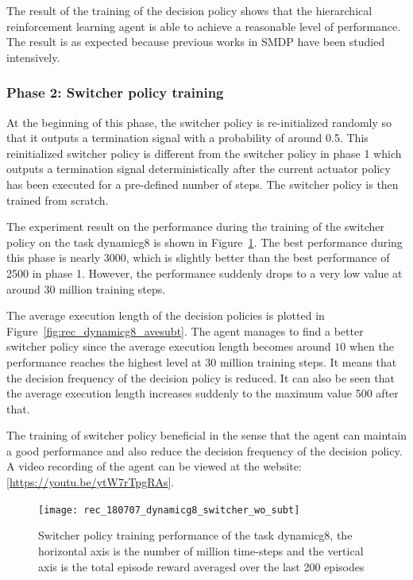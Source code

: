 The result of the training of the decision policy shows that the hierarchical reinforcement learning agent is able to achieve a reasonable level of performance. The result is as expected because previous works in SMDP have been studied intensively.

\subsubsection{Phase 2: Switcher policy training}
At the beginning of this phase, the switcher policy is re-initialized randomly so that it outputs a termination signal with a probability of around 0.5. This reinitialized switcher policy is different from the switcher policy in phase 1 which outputs a termination signal deterministically after the current actuator policy has been executed for a pre-defined number of steps. The switcher policy is then trained from scratch.

The experiment result on the performance during the training of the switcher policy on the task dynamicg8 is shown in Figure~\ref{fig:rec_dynamicg8_switcher}. The best performance during this phase is nearly 3000, which is slightly better than the best performance of 2500 in phase 1. However, the performance suddenly drops to a very low value at around 30 million training steps.

The average execution length of the decision policies is plotted in Figure~\ref{fig:rec_dynamicg8_avesubt}. The agent manages to find a better switcher policy since the average execution length becomes around $10$ when the performance reaches the highest level at 30 million training steps. It means that the decision frequency of the decision policy is reduced. It can also be seen that the average execution length increases suddenly to the maximum value 500 after that.

The training of switcher policy beneficial in the sense that the agent can maintain a good performance and also reduce the decision frequency of the decision policy. A video recording of the agent can be viewed at  the website: [\url{https://youtu.be/ytW7rTpgRAs}].
\begin{figure}[!htbp]
	\centering
	\texttt{[image: rec\_180707\_dynamicg8\_switcher\_wo\_subt]}
	\caption{Switcher policy training performance of the task dynamicg8, the horizontal axis is the number of million time-steps and the vertical axis is the total episode reward averaged over the last 200 episodes}
	\label{fig:rec_dynamicg8_switcher}
\end{figure}

